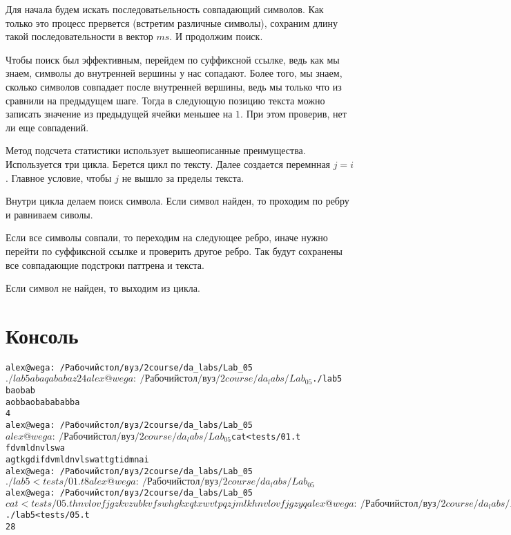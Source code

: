 Для начала будем искать последоватьельность совпадающий символов. Как только это процесс прервется (встретим различные символы), 
сохраним длину такой последовательности в вектор $ms$. И продолжим поиск. 

Чтобы поиск был эффективным, перейдем по суффиксной ссылке, ведь как мы знаем, символы до внутренней вершины у нас сопадают.
Более того, мы знаем, сколько символов совпадает после внутренней вершины, ведь мы только что из сравнили на предыдущем шаге.
Тогда в следующую позицию текста можно записать значение из предыдущей ячейки меньшее на $1$. 
При этом проверив, нет ли еще совпадений.

Метод подсчета статистики использует вышеописанные преимущества. Используется три цикла. Берется цикл по тексту.
Далее создается перемнная $j = i$. Главное условие, чтобы $j$ не вышло за пределы текста.

Внутри цикла делаем поиск символа. Если символ найден, то проходим по ребру и равниваем сиволы.

Если все символы совпали, то переходим на следующее ребро, иначе нужно перейти по суффиксной ссылке и проверить другое ребро.
Так будут сохранены все совпадающие подстроки паттрена и текста.

Если символ не найден, то выходим из цикла.

\pagebreak

\section{Консоль}
\begin{alltt}
alex@wega:~/Рабочий стол/вуз/2course/da_labs/Lab_05$ ./lab5 
aba
qababaz
2
4
alex@wega:~/Рабочий стол/вуз/2course/da_labs/Lab_05$ ./lab5 
baobab 
aobbaobabababba
4
alex@wega:~/Рабочий стол/вуз/2course/da_labs/Lab_05$ 
alex@wega:~/Рабочий стол/вуз/2course/da_labs/Lab_05$ cat < tests/01.t
fdvmldnvlswa
agtkgdifdvmldnvlswattgtidmnai
alex@wega:~/Рабочий стол/вуз/2course/da_labs/Lab_05$ ./lab5 < tests/01.t
8
alex@wega:~/Рабочий стол/вуз/2course/da_labs/Lab_05$ 
alex@wega:~/Рабочий стол/вуз/2course/da_labs/Lab_05$ cat < tests/05.t
hnvlovfjgz
kvzubkvfswhgkxqtxwvtpqzjmlkhnvlovfjgzyq
alex@wega:~/Рабочий стол/вуз/2course/da_labs/Lab_05$ ./lab5 < tests/05.t
28
\end{alltt}
\pagebreak
